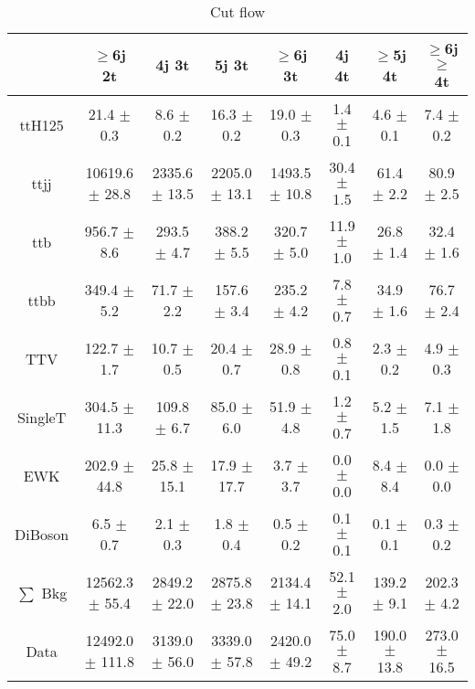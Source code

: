 \documentclass{article}
\begin{document}
        \begin{table*}[htbp]
        \begin{center}
\label{tab:cutflow}
\begin{tabular}{| c| c| c| c| c| c| c| c| }
\hline
 & $\ge$6j 2t  & 4j 3t  & 5j 3t  & $\ge$6j 3t  & 4j 4t  & $\ge$5j 4t  & $\ge$6j $\ge$ 4t \\ \hline
ttH125 &  21.4 $\pm$ 0.3  &  8.6 $\pm$ 0.2  &  16.3 $\pm$ 0.2  &  19.0 $\pm$ 0.3  &  1.4 $\pm$ 0.1  &  4.6 $\pm$ 0.1  &  7.4 $\pm$ 0.2 \\
ttjj &  10619.6 $\pm$ 28.8  &  2335.6 $\pm$ 13.5  &  2205.0 $\pm$ 13.1  &  1493.5 $\pm$ 10.8  &  30.4 $\pm$ 1.5  &  61.4 $\pm$ 2.2  &  80.9 $\pm$ 2.5 \\
ttb &  956.7 $\pm$ 8.6  &  293.5 $\pm$ 4.7  &  388.2 $\pm$ 5.5  &  320.7 $\pm$ 5.0  &  11.9 $\pm$ 1.0  &  26.8 $\pm$ 1.4  &  32.4 $\pm$ 1.6 \\
ttbb &  349.4 $\pm$ 5.2  &  71.7 $\pm$ 2.2  &  157.6 $\pm$ 3.4  &  235.2 $\pm$ 4.2  &  7.8 $\pm$ 0.7  &  34.9 $\pm$ 1.6  &  76.7 $\pm$ 2.4 \\
TTV &  122.7 $\pm$ 1.7  &  10.7 $\pm$ 0.5  &  20.4 $\pm$ 0.7  &  28.9 $\pm$ 0.8  &  0.8 $\pm$ 0.1  &  2.3 $\pm$ 0.2  &  4.9 $\pm$ 0.3 \\
SingleT &  304.5 $\pm$ 11.3  &  109.8 $\pm$ 6.7  &  85.0 $\pm$ 6.0  &  51.9 $\pm$ 4.8  &  1.2 $\pm$ 0.7  &  5.2 $\pm$ 1.5  &  7.1 $\pm$ 1.8 \\
EWK &  202.9 $\pm$ 44.8  &  25.8 $\pm$ 15.1  &  17.9 $\pm$ 17.7  &  3.7 $\pm$ 3.7  &  0.0 $\pm$ 0.0  &  8.4 $\pm$ 8.4  &  0.0 $\pm$ 0.0 \\
DiBoson &  6.5 $\pm$ 0.7  &  2.1 $\pm$ 0.3  &  1.8 $\pm$ 0.4  &  0.5 $\pm$ 0.2  &  0.1 $\pm$ 0.1  &  0.1 $\pm$ 0.1  &  0.3 $\pm$ 0.2 \\
\hline
$\sum$ Bkg &  12562.3 $\pm$ 55.4  &  2849.2 $\pm$ 22.0  &  2875.8 $\pm$ 23.8  &  2134.4 $\pm$ 14.1  &  52.1 $\pm$ 2.0  &  139.2 $\pm$ 9.1  &  202.3 $\pm$ 4.2 \\
\hline
Data &  12492.0 $\pm$ 111.8  &  3139.0 $\pm$ 56.0  &  3339.0 $\pm$ 57.8  &  2420.0 $\pm$ 49.2  &  75.0 $\pm$ 8.7  &  190.0 $\pm$ 13.8  &  273.0 $\pm$ 16.5 \\
\hline

        \end{tabular}
        
        \caption{Cut flow}
        \end{center}
        \end{table*}

        
\end{document}
